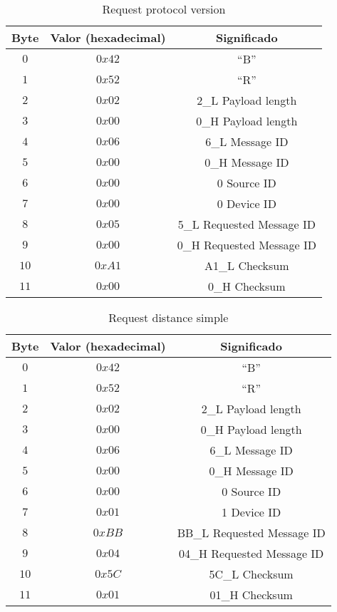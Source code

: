 \begin{table}[h]
\centering
\caption{Request protocol version}
\begin{tabular}{|c|c|c|}
	\hline
	\textbf{Byte}	&\textbf{Valor (hexadecimal)} &\textbf{Significado} \\ \hline  \hline
	$0$		&$0x42$		& ``B'' \\ \hline
	$1$		&$0x52$		& ``R'' \\ \hline
	$2$		&$0x02$		& 2\_L Payload length \\ \hline
	$3$		&$0x00$		& 0\_H Payload length \\ \hline
	$4$		&$0x06$		& 6\_L Message ID \\ \hline
	$5$		&$0x00$		& 0\_H Message ID \\ \hline
	$6$		&$0x00$		& 0    Source ID \\ \hline 
	$7$		&$0x00$		& 0    Device ID \\ \hline
	$8$		&$0x05$		& 5\_L Requested Message ID \\ \hline
	$9$		&$0x00$		& 0\_H Requested Message ID\\ \hline  
	$10$	&$0xA1$		& A1\_L Checksum\\ \hline   
	$11$	&$0x00$		& 0\_H Checksum\\ \hline  
\end{tabular}
\label{tab:2}
\end{table}	

\begin{table}[h]
	\centering
	\caption{Request distance simple}
	\begin{tabular}{|c|c|c|}
		\hline
		\textbf{Byte}	&\textbf{Valor (hexadecimal)} &\textbf{Significado} \\ \hline  \hline
		$0$		&$0x42$		& ``B'' \\ \hline
		$1$		&$0x52$		& ``R'' \\ \hline
		$2$		&$0x02$		& 2\_L Payload length \\ \hline
		$3$		&$0x00$		& 0\_H Payload length \\ \hline
		$4$		&$0x06$		& 6\_L Message ID \\ \hline
		$5$		&$0x00$		& 0\_H Message ID \\ \hline
		$6$		&$0x00$		& 0    Source ID \\ \hline 
		$7$		&$0x01$		& 1    Device ID \\ \hline
		$8$		&$0xBB$		& BB\_L Requested Message ID \\ \hline
		$9$		&$0x04$		& 04\_H Requested Message ID\\ \hline  
		$10$	&$0x5C$		& 5C\_L Checksum\\ \hline   
		$11$	&$0x01$		& 01\_H Checksum\\ \hline  
	\end{tabular}
	\label{tab:3}
\end{table}

